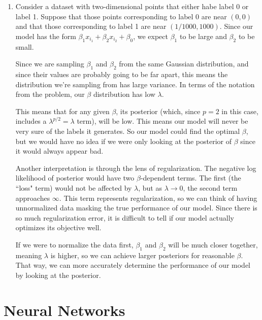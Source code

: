 \documentclass{article}
\begin{document}
\begin{enumerate}
	\item
		Consider a dataset with two-dimensional points that either habe label 0 or label 1. Suppose that those points corresponding to label $0$ are near $(0, 0)$ and that those corresponding to label 1 are near $(1/1000, 1000)$. Since our model has the form $\beta_1 x_{i_1} + \beta_2 x_{i_2} + \beta_0$, we expect $\beta_1$ to be large and $\beta_2$ to be small.

		Since we are sampling $\beta_1$ and $\beta_2$ from the same Gaussian distribution, and since their values are probably going to be far apart, this means the distribution we're sampling from has large variance. In terms of the notation from the problem, our $\beta$ distribution has low $\lambda$.

		This means that for any given $\beta$, its posterior (which, since $p=2$ in this case, includes a $\lambda^{p/2} = \lambda$ term), will be low. This means our model will never be very sure of the labels it generates. So our model could find the optimal $\beta$, but we would have no idea if we were only looking at the posterior of $\beta$ since it would always appear bad.

		Another interpretation is through the lens of regularization. The negative log likelihood of posterior would have two $\beta$-dependent terms. The first (the ``loss" term) would not be affected by $\lambda$, but as $\lambda \to 0$, the second term approaches $\infty$. This term represents regularization, so we can think of having unnormalized data masking the true performance of our model. Since there is so much regularization error, it is difficult to tell if our model actually optimizes its objective well.

		If we were to normalize the data first, $\beta_1$ and $\beta_2$ will be much closer together, meaning $\lambda$ is higher, so we can achieve larger posteriors for reasonable $\beta$. That way, we can more accurately determine the performance of our model by looking at the posterior.
\end{enumerate}


\pagebreak
\section{Neural Networks}
\end{document}
